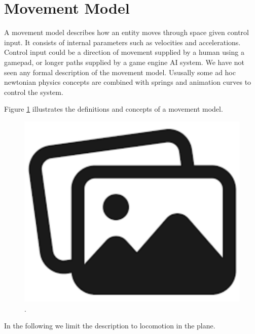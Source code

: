 \section{Movement Model}


A movement model describes how an entity moves through space given control input. It consists of internal parameters such as velocities and accelerations. Control input could be a direction of movement supplied by a human using a gamepad, or longer paths supplied by a game engine AI system. We have not seen any formal description of the movement model. Ususally some ad hoc newtonian physics concepts are combined with springs and animation curves to control the system.

Figure \ref{fig:movement:model} illustrates the definitions and concepts of a movement model.
\begin{figure}
    \centering
    \includegraphics[width=0.75\columnwidth]{img/temporary.png}
    \caption{.}
    \label{fig:movement:model}
\end{figure}
In the following we limit  the description to locomotion in the plane. 
